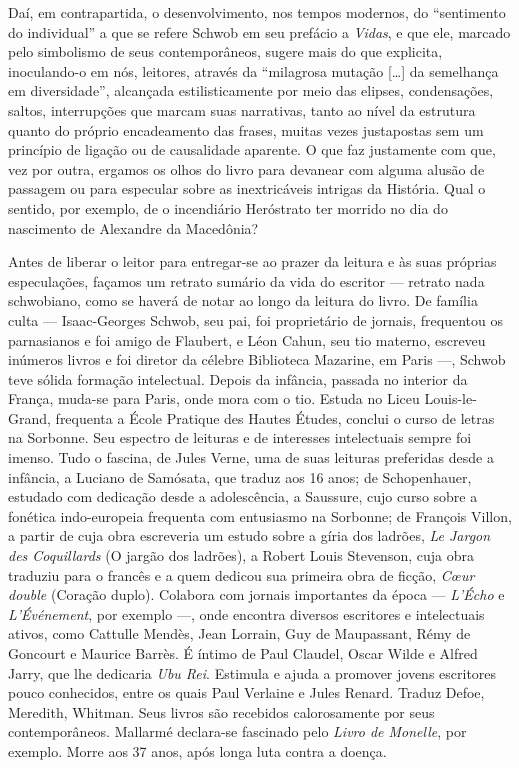 Daí, em contrapartida, o desenvolvimento, nos tempos modernos, do “sentimento do
individual” a que se refere Schwob em seu prefácio a \textit{Vidas}, e
que ele, marcado pelo simbolismo de seus contemporâneos, sugere mais do que
explicita, inoculando-o em nós, leitores, através da “milagrosa mutação [\ldots{}]
da semelhança em diversidade”, alcançada estilisticamente por meio das
elipses, condensações, saltos, interrupções que marcam suas narrativas, tanto
ao nível da estrutura quanto do próprio encadeamento das frases, muitas vezes
justapostas sem um princípio de ligação ou de causalidade aparente. O que faz
justamente com que, vez por outra, ergamos os olhos do livro para devanear com
alguma alusão de passagem ou para especular sobre as inextricáveis intrigas da
História. Qual o sentido, por exemplo, de o incendiário Heróstrato ter morrido
no dia do nascimento de Alexandre da Macedônia? 

Antes de liberar o leitor para entregar-se ao prazer da leitura e às suas
próprias especulações, façamos um retrato sumário da vida do escritor --- retrato
nada schwobiano, como se haverá de notar ao longo da leitura do livro. De
família culta --- Isaac-Georges Schwob, seu pai, foi proprietário de jornais,
frequentou os parnasianos e foi amigo de Flaubert, e Léon Cahun, seu tio
materno, escreveu inúmeros livros e foi diretor da célebre Biblioteca Mazarine,
em Paris ---, Schwob teve sólida formação intelectual. Depois da infância,
passada no interior da França, muda-se para Paris, onde mora com o tio. Estuda
no Liceu Louis-le-Grand, frequenta a École Pratique des Hautes Études, conclui
o curso de letras na Sorbonne. Seu espectro de leituras e de interesses
intelectuais sempre foi imenso. Tudo o fascina, de Jules Verne, uma de suas
leituras preferidas desde a infância, a Luciano de Samósata, que traduz aos 16
anos; de Schopenhauer, estudado com dedicação desde a adolescência, a Saussure,
cujo curso sobre a fonética indo-europeia frequenta com entusiasmo na Sorbonne;
de François Villon, a partir de cuja obra escreveria um estudo sobre a gíria
dos ladrões, \textit{Le Jargon des Coquillards} (O jargão dos
ladrões), a Robert Louis Stevenson, cuja obra traduziu para o francês e a quem
dedicou sua primeira obra de ficção, \textit{C\oe ur double} (Coração
duplo). Colabora com jornais importantes da época --- \textit{L'Écho} e
\textit{L'Événement}, por exemplo ---, onde encontra diversos escritores e
intelectuais ativos, como Cattulle Mendès, Jean Lorrain, Guy de Maupassant,
Rémy de Goncourt e Maurice Barrès. É íntimo de Paul Claudel, Oscar Wilde e
Alfred Jarry, que lhe dedicaria \textit{Ubu Rei}. Estimula e ajuda a promover
jovens escritores pouco conhecidos, entre os quais Paul Verlaine e Jules
Renard. Traduz Defoe, Meredith, Whitman. Seus livros são recebidos
calorosamente por seus contemporâneos. Mallarmé declara-se fascinado pelo
\textit{Livro de Monelle}, por exemplo. Morre aos 37 anos, após longa luta
contra a doença.


